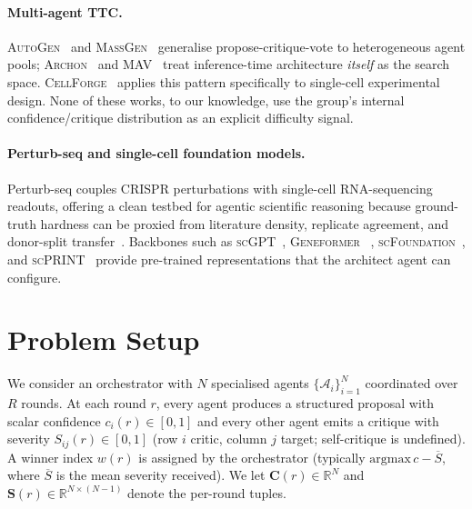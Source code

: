 \documentclass[10pt,a4paper]{article}
\begin{document}
\paragraph{Multi-agent TTC.} \textsc{AutoGen}~\citep{wu2023autogen} and
\textsc{MassGen}~\citep{massgen2025github} generalise propose-critique-vote to
heterogeneous agent pools; \textsc{Archon}~\citep{saad2024archon} and
\textsc{MAV}~\citep{lifshitz2025mav} treat inference-time architecture
\emph{itself} as the search space. \textsc{CellForge}~\citep{chen2025cellforge}
applies this pattern specifically to single-cell experimental design. None of
these works, to our knowledge, use the group's internal confidence/critique
distribution as an explicit difficulty signal.

\paragraph{Perturb-seq and single-cell foundation models.} Perturb-seq
couples CRISPR perturbations with single-cell RNA-sequencing readouts,
offering a clean testbed for agentic scientific reasoning because ground-truth
hardness can be proxied from literature density, replicate agreement, and
donor-split transfer~\citep{norman2019perturbseq,adamson2016perturbseq,
replogle2022perturbseq}. Backbones such as
\textsc{scGPT}~\citep{cui2024scgpt}, \textsc{Geneformer}%
~\citep{theodoris2023geneformer}, \textsc{scFoundation}~\citep{hao2024scfoundation},
and \textsc{scPRINT}~\citep{kalfon2025scprint} provide pre-trained
representations that the architect agent can configure.

\section{Problem Setup}\label{sec:setup}

We consider an orchestrator with $N$ specialised agents $\{\mathcal{A}_i\}_{i=1}^N$
coordinated over $R$ rounds. At each round $r$, every agent produces a
structured proposal with scalar confidence $c_i(r) \in [0,1]$ and every other
agent emits a critique with severity $S_{ij}(r) \in [0,1]$ (row $i$ critic,
column $j$ target; self-critique is undefined). A winner index $w(r)$ is
assigned by the orchestrator (typically $\mathrm{argmax}\, c - \overline{S}$,
where $\overline{S}$ is the mean severity received). We let
$\mathbf{C}(r)\!\in\!\mathbb{R}^N$ and $\mathbf{S}(r)\!\in\!\mathbb{R}^{N\times(N-1)}$
denote the per-round tuples.
\end{document}
